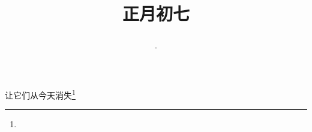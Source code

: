 \title{\date[d=16,m=2,y=2024][year:cn-y,年,month:cn,day:cn,日,·,weekday]·正月初七 }
让它们从今天消失\footnote{ }

